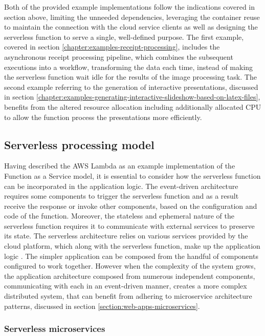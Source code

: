Both of the provided example implementations follow the indications covered in section above, limiting the unneeded dependencies, leveraging the container reuse to maintain the connection with the cloud service clients as well as designing the serverless function to serve a single, well-defined purpose.
The first example, covered in section \ref{chapter:examples-receipt-processing}, includes the asynchronous receipt processing pipeline, which combines the subsequent executions into a workflow, transforming the data each time, instead of making the serverless function wait idle for the results of the image processing task.
The second example referring to the generation of interactive presentations, discussed in section \ref{chapter:examples-generating-interactive-slideshow-based-on-latex-files}, benefits from the altered resource allocation including additionally allocated CPU to allow the function process the presentations more efficiently.

\subsection{Serverless processing model}

Having described the AWS Lambda as an example implementation of the Function as a Service model, it is essential to consider how the serverless function can be incorporated in the application logic.
The event-driven architecture requires some components to trigger the serverless function and as a result receive the response or invoke other components, based on the configuration and code of the function.
Moreover, the stateless and ephemeral nature of the serverless function requires it to communicate with external services to preserve its state.
The serverless architecture relies on various services provided by the cloud platform, which along with the serverless function, make up the application logic \cite{EvaluationOfServerlessApplicationProgrammingModel}.
The simpler application can be composed from the handful of components configured to work together. 
However when the complexity of the system grows, the application architecture composed from numerous independent components, communicating with each in an event-driven manner, creates a more complex distributed system, that can benefit from adhering to microservice architecture patterns, discussed in section \ref{section:web-apps-microservices}.

\subsubsection{Serverless microservices}

